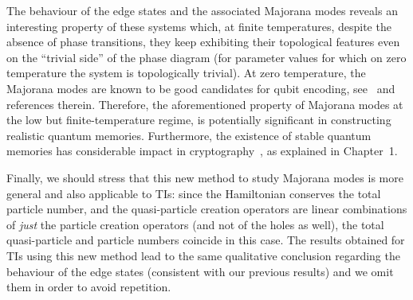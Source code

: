The behaviour of the edge states and the associated Majorana modes reveals an interesting property of these systems which, at finite temperatures, despite the absence of phase transitions, they keep exhibiting their topological features even on the ``trivial side'' of the phase diagram (for parameter values for which on zero temperature the system is topologically trivial). At zero temperature, the Majorana modes are known to be good candidates for qubit encoding, see~\cite{ali:12,ipp:riz:gio:maz:16,majorana:17,majorana:twist:17} and references therein. Therefore, the aforementioned property of Majorana modes at the low but finite-temperature regime, is potentially significant in constructing realistic quantum memories. Furthermore, the existence of stable quantum memories has considerable impact in cryptography~\cite{rod:mat:pau:sou:17,pir:ott:spe:wee:bra:llo:geh:jac:and:15,ber:chr:col:ren:ren:10,dam:feh:ren:sal:sch:07,weh:sch:ter:08,sch:ter:weh:09,ng:jos:che:kur:weh:12,koe:weh:wul:12,bou:feh:gon:sch:13,lou:alm:and:pin:mat:pau:14}, as explained in Chapter~1.

Finally, we should stress that this new method to study Majorana modes is more general and also applicable to TIs: since the Hamiltonian conserves the total particle number, and the quasi-particle creation operators are linear combinations of {\em just} the particle creation operators (and not of the holes as well), the total quasi-particle and particle numbers coincide in this case. The results obtained for TIs using this new method lead to the same qualitative conclusion regarding the behaviour of the edge states (consistent with our previous results) and we omit them in order to avoid repetition.


